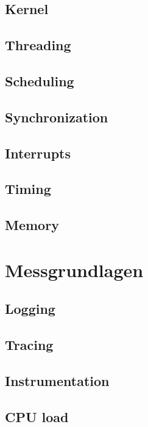 \subsection{Kernel}

\subsection{Threading}

\subsection{Scheduling}

\subsection{Synchronization}

\subsection{Interrupts}

\subsection{Timing}

\subsection{Memory}

\section{Messgrundlagen}

\subsection{Logging}

\subsection{Tracing}

\subsection{Instrumentation}

\subsection{CPU load}

